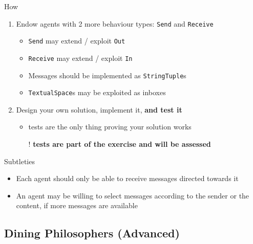 \documentclass[presentation]{beamer}\mode<presentation>{\usetheme{AMSCesenaPurpleAndGold}}
\begin{document}
\begin{frame}[allowframebreaks]
	\begin{block}{How}
		\begin{enumerate}
			\item Endow agents with 2 more behaviour types: \alert{\texttt{Send}} and \alert{\texttt{Receive}}
			\begin{itemize}
				\item \texttt{Send} may extend / exploit \texttt{Out}
				\item \texttt{Receive} may extend / exploit \texttt{In}
				\item Messages should be implemented as \texttt{StringTuple}s
				\item \texttt{TextualSpace}s may be exploited as \alert{inboxes}
			\end{itemize}
			\item Design your own solution, implement it, \textbf{and test it}
			\begin{itemize}
				\item tests are the only thing proving your solution works
				\item[!] \textbf{tests are part of the exercise and will be assessed}
			\end{itemize}
		\end{enumerate}
	\end{block}

	\begin{exampleblock}{Subtleties}
		\begin{itemize}
			\item Each agent should only be able to receive messages \alert{directed towards it}
			\item An agent may be willing to \alert{select} messages according to the sender or the content, if more messages are available
		\end{itemize}
	\end{exampleblock}
\end{frame}

\startExercise

\subsection{Dining Philosophers (Advanced)}
\end{document}
